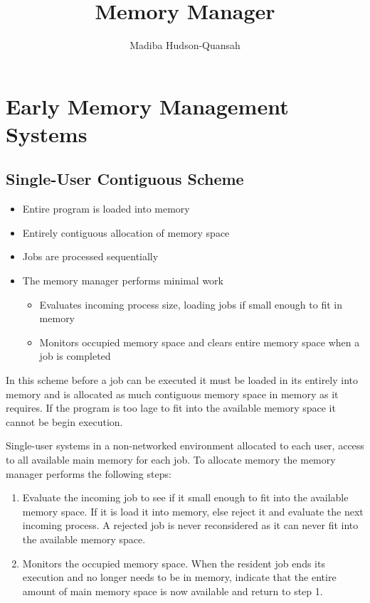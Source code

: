 \documentclass[12pt letter]{report}
\title{\Huge{Memory Manager}}
\author{\huge{Madiba Hudson-Quansah}}
\date{}
\begin{document}
\maketitle
\newpage
{}
\tableofcontents
\pagebreak

\chapter{Early Memory Management Systems}

\section {Single-User Contiguous Scheme}

\begin{itemize}
  \item Entire program is loaded into memory
  \item  Entirely contiguous allocation of memory space
  \item Jobs are processed sequentially
  \item The memory manager performs minimal work
        \begin{itemize}
          \item Evaluates incoming process size, loading jobs if small enough to fit in memory
          \item Monitors occupied memory space and clears entire memory space when a job is completed
        \end{itemize}
\end{itemize}

In this scheme before a job can be executed it must be loaded in its entirely into memory and is allocated as much contiguous memory space in  memory as it requires.  If the program is too lage to fit into the available memory space it cannot be begin execution.

Single-user systems in a non-networked environment allocated to each user, access to all available main  memory for each job. To allocate memory the memory manager performs the following steps:
\begin{enumerate}
  \item Evaluate the incoming job to see if it small enough to fit into the available memory space. If it is load it into memory, else reject it and evaluate the next incoming process. A rejected job is never reconsidered as it can never fit into the available memory space.
  \item Monitors the occupied memory space. When the resident job ends its execution and no longer needs to be in memory, indicate that the entire amount of main memory space is now available and return to step 1.
\end{enumerate}
\end{document}
